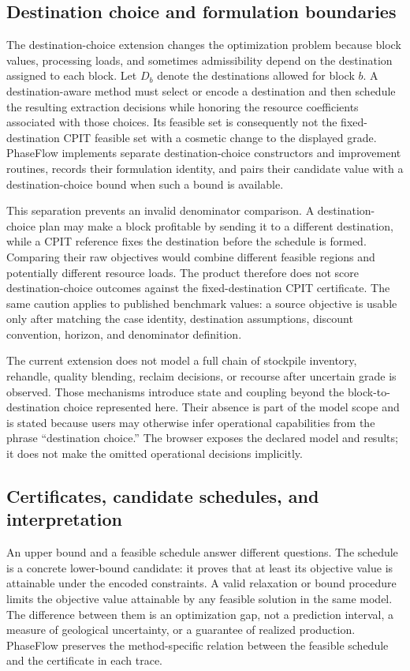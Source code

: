\subsection{Destination choice and formulation boundaries}
The destination-choice extension changes the optimization problem because block values, processing loads, and sometimes admissibility depend on the destination assigned to each block. Let $D_b$ denote the destinations allowed for block $b$. A destination-aware method must select or encode a destination and then schedule the resulting extraction decisions while honoring the resource coefficients associated with those choices. Its feasible set is consequently not the fixed-destination CPIT feasible set with a cosmetic change to the displayed grade. PhaseFlow implements separate destination-choice constructors and improvement routines, records their formulation identity, and pairs their candidate value with a destination-choice bound when such a bound is available.

This separation prevents an invalid denominator comparison. A destination-choice plan may make a block profitable by sending it to a different destination, while a CPIT reference fixes the destination before the schedule is formed. Comparing their raw objectives would combine different feasible regions and potentially different resource loads. The product therefore does not score destination-choice outcomes against the fixed-destination CPIT certificate. The same caution applies to published benchmark values: a source objective is usable only after matching the case identity, destination assumptions, discount convention, horizon, and denominator definition.

The current extension does not model a full chain of stockpile inventory, rehandle, quality blending, reclaim decisions, or recourse after uncertain grade is observed. Those mechanisms introduce state and coupling beyond the block-to-destination choice represented here. Their absence is part of the model scope and is stated because users may otherwise infer operational capabilities from the phrase “destination choice.” The browser exposes the declared model and results; it does not make the omitted operational decisions implicitly.

\subsection{Certificates, candidate schedules, and interpretation}
An upper bound and a feasible schedule answer different questions. The schedule is a concrete lower-bound candidate: it proves that at least its objective value is attainable under the encoded constraints. A valid relaxation or bound procedure limits the objective value attainable by any feasible solution in the same model. The difference between them is an optimization gap, not a prediction interval, a measure of geological uncertainty, or a guarantee of realized production. PhaseFlow preserves the method-specific relation between the feasible schedule and the certificate in each trace.

